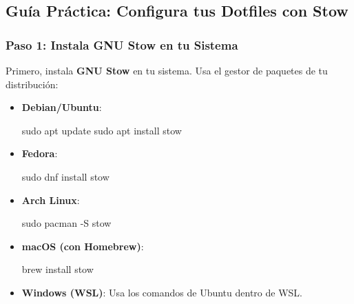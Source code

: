 \documentclass[
  jou,
  floatsintext,
  longtable,
  a4paper,
  nolmodern,
  notxfonts,
  notimes,
  colorlinks=true,linkcolor=blue,citecolor=blue,urlcolor=blue]{apa7}
\newenvironment{Shaded}{\begin{snugshade}}{\end{snugshade}}
\newcommand{\AttributeTok}[1]{\textcolor[rgb]{0.40,0.45,0.13}{#1}}
\newcommand{\ExtensionTok}[1]{\textcolor[rgb]{0.00,0.23,0.31}{#1}}
\newcommand{\FunctionTok}[1]{\textcolor[rgb]{0.28,0.35,0.67}{#1}}
\newcommand{\NormalTok}[1]{\textcolor[rgb]{0.00,0.23,0.31}{#1}}
\begin{document}
\subsection{Guía Práctica: Configura tus Dotfiles con
Stow}\label{guuxeda-pruxe1ctica-configura-tus-dotfiles-con-stow}

\subsubsection{Paso 1: Instala GNU Stow en tu
Sistema}\label{paso-1-instala-gnu-stow-en-tu-sistema}

Primero, instala \textbf{GNU Stow} en tu sistema. Usa el gestor de
paquetes de tu distribución:

\begin{itemize}
\item
  \textbf{Debian/Ubuntu}:

\begin{Shaded}
\begin{Highlighting}[]
\FunctionTok{sudo}\NormalTok{ apt update}
\FunctionTok{sudo}\NormalTok{ apt install stow}
\end{Highlighting}
\end{Shaded}
\item
  \textbf{Fedora}:

\begin{Shaded}
\begin{Highlighting}[]
\FunctionTok{sudo}\NormalTok{ dnf install stow}
\end{Highlighting}
\end{Shaded}
\item
  \textbf{Arch Linux}:

\begin{Shaded}
\begin{Highlighting}[]
\FunctionTok{sudo}\NormalTok{ pacman }\AttributeTok{{-}S}\NormalTok{ stow}
\end{Highlighting}
\end{Shaded}
\item
  \textbf{macOS (con Homebrew)}:

\begin{Shaded}
\begin{Highlighting}[]
\ExtensionTok{brew}\NormalTok{ install stow}
\end{Highlighting}
\end{Shaded}
\item
  \textbf{Windows (WSL)}: Usa los comandos de Ubuntu dentro de WSL.
\end{itemize}
\end{document}
